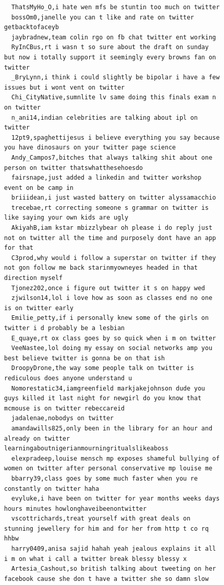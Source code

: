 \begin{figure}[htpb]
\begin{verbatim}
  ThatsMyHo_O,i hate wen mfs be stuntin too much on twitter
  bossOm0,janelle you can t like and rate on twitter getbacktofaceyb
  jaybradnew,team colin rgo on fb chat twitter ent working
  RyInCBus,rt i wasn t so sure about the draft on sunday but now i totally support it seemingly every browns fan on twitter
  _BryLynn,i think i could slightly be bipolar i have a few issues but i wont vent on twitter
  Chi_CityNative,sumnlite lv same doing this finals exam n on twitter
  n_ani14,indian celebrities are talking about ipl on twitter
  12pt9,spaghettijesus i believe everything you say because you have dinosaurs on your twitter page science
  Andy_Campos7,bitches that always talking shit about one person on twitter thatswhatthesehoesdo
  fairsnape,just added a linkedin and twitter workshop event on be camp in
  briiidean,i just wasted battery on twitter alyssamacchio
  trecebae,rt correcting someone s grammar on twitter is like saying your own kids are ugly
  AkiyahB,iam kstar mbizzlybear oh please i do reply just not on twitter all the time and purposely dont have an app for that
  C3prod,why would i follow a superstar on twitter if they not gon follow me back starinmyowneyes headed in that direction myself
  Tjonez202,once i figure out twitter it s on happy wed
  zjwilson14,lol i love how as soon as classes end no one is on twitter early
  Emilie_petty,if i personally knew some of the girls on twitter i d probably be a lesbian
  E_quaye,rt ox class goes by so quick when i m on twitter
  VeeNastee,lol doing my essay on social networks amp you best believe twitter is gonna be on that ish
  DroopyDrone,the way some people talk on twitter is rediculous does anyone understand u
  Nomorestatic34,iamgreenfield markjakejohnson dude you guys killed it last night for newgirl do you know that mcmouse is on twitter rebeccareid
  jadalenae,nobodys on twitter
  amandawills825,only been in the library for an hour and already on twitter learningaboutnigerianmourningritualslikeaboss
  elexpradeep,louise mensch mp exposes shameful bullying of women on twitter after personal conservative mp louise me
  bbarry39,class goes by some much faster when you re constantly on twitter haha
  evyluke,i have been on twitter for year months weeks days hours minutes howlonghaveibeenontwitter
  vscottrichards,treat yourself with great deals on stunning jewellery for him and for her from http t co rq hhbw
  harry0409,anisa sajid hahah yeah jealous explains it all i m on what i call a twitter break blessy blessy x
  Artesia_Cashout,so british talking about tweeting on her facebook cause she don t have a twitter she so damn slow

\end{verbatim}
\end{figure}
